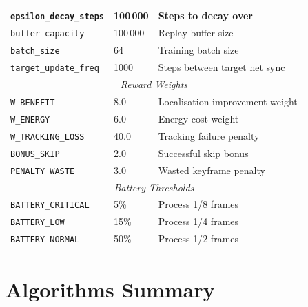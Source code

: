 \documentclass[12pt,a4paper,twoside]{report}
\theoremstyle{definition}
\newcommand{\code}[1]{\texttt{#1}}
\begin{document}
\begin{longtable}{|p{4.5cm}|p{2.5cm}|p{6.5cm}|}
\code{epsilon\_decay\_steps} & 100\,000 & Steps to decay over \\ \hline
\code{buffer capacity} & 100\,000 & Replay buffer size \\ \hline
\code{batch\_size} & 64 & Training batch size \\ \hline
\code{target\_update\_freq} & 1000 & Steps between target net sync \\ \hline
\multicolumn{3}{c}{\textit{Reward Weights}} \\ \hline
\code{W\_BENEFIT} & 8.0 & Localisation improvement weight \\ \hline
\code{W\_ENERGY} & 6.0 & Energy cost weight \\ \hline
\code{W\_TRACKING\_LOSS} & 40.0 & Tracking failure penalty \\ \hline
\code{BONUS\_SKIP} & 2.0 & Successful skip bonus \\ \hline
\code{PENALTY\_WASTE} & 3.0 & Wasted keyframe penalty \\ \hline
\multicolumn{3}{c}{\textit{Battery Thresholds}} \\ \hline
\code{BATTERY\_CRITICAL} & 5\% & Process 1/8 frames \\ \hline
\code{BATTERY\_LOW} & 15\% & Process 1/4 frames \\ \hline
\code{BATTERY\_NORMAL} & 50\% & Process 1/2 frames \\ \hline
\end{longtable}

\chapter{Algorithms Summary}
\end{document}
